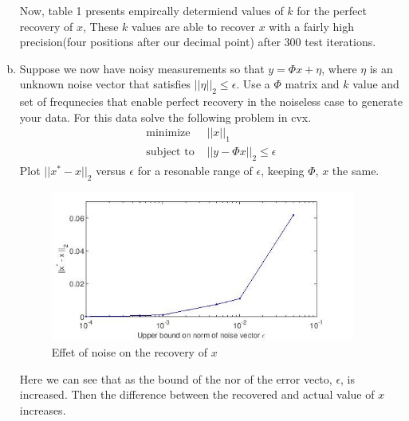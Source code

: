 \begin{enumerate}[(a)]
{Now, table 1 presents empircally determiend values of $k$ for the perfect recovery of $x$, These $k$ values are able to recover $x$ with a fairly high precision(four positions after our decimal point) after 300 test iterations.
  }
\item{Suppose we now have noisy measurements so that $y = \Phi x + \eta$,
  where $\eta$ is an unknown noise vector that satisfies
  $\vert \vert \eta \vert \vert_{2} \leq \epsilon$. Use a $\Phi$ matrix
  and $k$ value and set of frequnecies that enable perfect recovery
  in the noiseless case to generate your data. For this data solve the following
  problem in cvx.
  \begin{eqnarray*}
    \mbox{minimize } & \vert \vert x \vert \vert_{1}\\
    \mbox{subject to } & \vert \vert y - \Phi x \vert \vert_{2} \leq \epsilon
  \end{eqnarray*}
  Plot $\vert \vert x^{*} - x \vert \vert_{2}$ versus $\epsilon$ for a
  resonable range of $\epsilon$, keeping $\Phi$, $x$ the same.
  \begin{figure}[H]
  \centering
\includegraphics[width=10cm]{source/prob5/fig1}
\caption{Effet of noise on the recovery of $x$}
\end{figure}

Here we can see that as the bound of the nor of the error vecto, $\epsilon$, is increased. Then the difference between the recovered and actual value of $x$ increases.
  }
\end{enumerate}